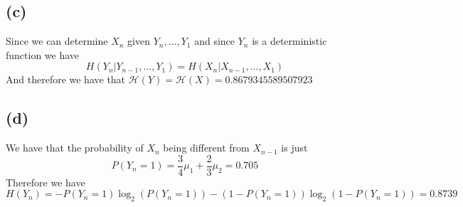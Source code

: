 \subsection*{(c)}
Since we can determine $X_n$ given $Y_n,...,Y_1$ and since 
$Y_n$ is a deterministic function we have
$$H(Y_n|Y_{n-1},\dots,Y_1)=H(X_{n}|X_{n-1},...,X_1)$$
And therefore we have that 
$\mathcal{H}(Y)=\mathcal{H}(X)=\boxed{0.8679345589507923}$
\subsection*{(d)}
We have that the probability of $X_n$ being different from $X_{n-1}$
is just 
$$P(Y_n=1)=\frac{3}{4}\mu_1+\frac{2}{3}\mu_2=0.705$$
Therefore we have 
$$H(Y_n)=-P(Y_n=1)\log_2(P(Y_n=1))-(1-P(Y_n=1))\log_2(1-P(Y_n=1))=\boxed{0.8739}$$



